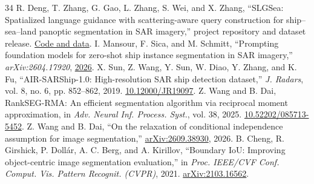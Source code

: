 \documentclass[journal]{IEEEtran}
\begin{document}
\begin{thebibliography}{34}
 R. Deng, T. Zhang, G. Gao, L. Zhang, S. Wei, and X. Zhang, ``SLGSea: Spatialized language guidance with scattering-aware query construction for ship--sea--land panoptic segmentation in SAR imagery,'' project repository and dataset release. \href{https://github.com/deng1218/SLGSea}{Code and data}.
 I. Mansour, F. Sica, and M. Schmitt, ``Prompting foundation models for zero-shot ship instance segmentation in SAR imagery,'' \emph{arXiv:2604.17920}, \href{https://arxiv.org/abs/2604.17920}{2026}.
 X. Sun, Z. Wang, Y. Sun, W. Diao, Y. Zhang, and K. Fu, ``AIR-SARShip-1.0: High-resolution SAR ship detection dataset,'' \emph{J. Radars}, vol. 8, no. 6, pp. 852--862, 2019. \href{https://doi.org/10.12000/JR19097}{10.12000/JR19097}.
 Z. Wang and B. Dai, RankSEG-RMA: An efficient segmentation algorithm via reciprocal moment approximation, in \emph{Adv. Neural Inf. Process. Syst.}, vol. 38, 2025. \href{https://doi.org/10.52202/085713-5452}{10.52202/085713-5452}.
 Z. Wang and B. Dai, ``On the relaxation of conditional independence assumption for image segmentation,'' \href{https://arxiv.org/abs/2609.38930}{arXiv:2609.38930}, 2026.
 B. Cheng, R. Girshick, P. Doll{\'a}r, A. C. Berg, and A. Kirillov, ``Boundary IoU: Improving object-centric image segmentation evaluation,'' in \emph{Proc. IEEE/CVF Conf. Comput. Vis. Pattern Recognit. (CVPR)}, 2021. \href{https://arxiv.org/abs/2103.16562}{arXiv:2103.16562}.
\end{thebibliography}
\end{document}
